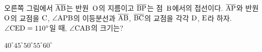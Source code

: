 \noindent\begin{minipage}[t]{0.58\linewidth}\vspace{0pt}\raggedright 오른쪽 그림에서 $\overline{\mathrm{AB}}$는 반원~$\mathrm{O}$의 지름이고 $\overline{\mathrm{BP}}$는 점~$\mathrm{B}$에서의 접선이다. $\overline{\mathrm{AP}}$와 반원~$\mathrm{O}$의 교점을 $\mathrm{C}$, $\angle\mathrm{APB}$의 이등분선과 $\overline{\mathrm{AB}}$, $\overline{\mathrm{BC}}$의 교점을 각각 $\mathrm{D}$, $\mathrm{E}$라 하자. $\angle\mathrm{CED}=110^\circ$일 때, $\angle\mathrm{CAB}$의 크기는?\end{minipage}\hfill\begin{minipage}[t]{0.4\linewidth}\vspace{0pt}\centering \resizebox{\ifdim\width>\linewidth\linewidth\else\width\fi}{!}{}\end{minipage}\par
\begin{choices32}{$40^\circ$}{$45^\circ$}{$50^\circ$}{$55^\circ$}{$60^\circ$}\end{choices32}
